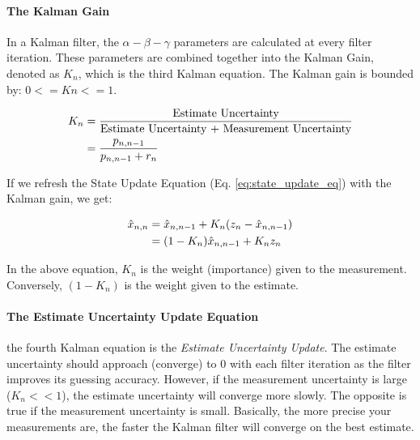         \paragraph*{The Kalman Gain} In a Kalman filter, the $\alpha-\beta-\gamma$ parameters are calculated at every filter iteration.
        These parameters are combined together into the Kalman Gain, denoted as $K_n$, which is the third Kalman equation.
        The Kalman gain is bounded by: $0 <= Kn <= 1$.

        \begin{equation} \labeq{kalman_gain}
            \begin{aligned}
                K_n &= \frac{\text{Estimate Uncertainty}}{\text{Estimate Uncertainty + Measurement Uncertainty}} \\
                    &= \frac{p_{n,n-1}}{p_{n,n-1} + r_n}
            \end{aligned}
        \end{equation}

        If we refresh the State Update Equation (Eq. \ref{eq:state_update_eq}) with the Kalman gain, we get:

        \begin{equation} \labeq{kalman_state_update_eq}
            \begin{aligned}
                \hat{x}_{n,n} &= \hat{x}_{n,n-1} + K_n(z_n - \hat{x}_{n,n-1}) \\
                              &= (1-K_n)\hat{x}_{n,n-1} + K_n z_n \\
            \end{aligned}
        \end{equation}

        In the above equation, $K_n$ is the weight (importance) given to the measurement.
        Conversely, $(1-K_n)$ is the weight given to the estimate.


        \paragraph*{The Estimate Uncertainty Update Equation} the fourth Kalman equation is the \textit{Estimate Uncertainty Update}. 
        The estimate uncertainty should approach (converge) to 0 with each filter iteration as the filter improves its guessing accuracy.
        However, if the measurement uncertainty is large ($K_n << 1$), the estimate uncertainty will converge more slowly.
        The opposite is true if the measurement uncertainty is small.
        Basically, the more precise your measurements are, the faster the Kalman filter will converge on the best estimate.

